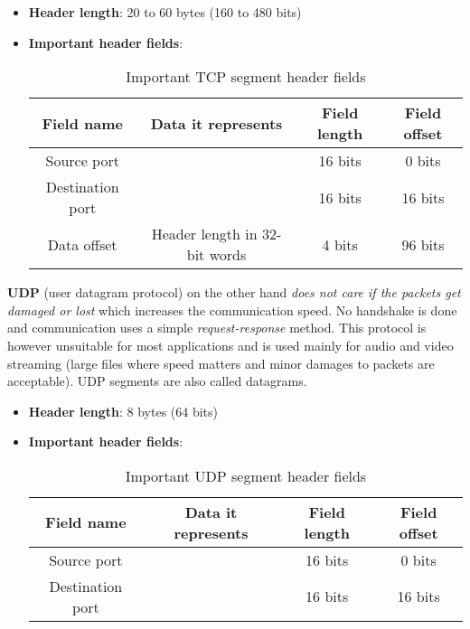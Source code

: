 \documentclass[a4paper]{article}
\begin{document}
  \begin{itemize}
    \item \textbf{Header length}: 20 to 60 bytes (160 to 480 bits)
    \item \textbf{Important header fields}:
      \begin{table}[h]
        \centering
        \begin{tabular}{|c|c|c|c|}
          \hline
          Field name & Data it represents & Field length & Field offset \\
          \hline
          \hline
          Source port & & 16 bits & 0 bits \\
          \hline
          Destination port & & 16 bits & 16 bits \\
          \hline
          Data offset & Header length in 32-bit words & 4 bits & 96 bits \\
          \hline
        \end{tabular}
        \caption{Important TCP segment header fields}
      \end{table}
  \end{itemize}

  \vspace{1cm}


  \textbf{UDP} (user datagram protocol) on the other hand 
  \textit{does not care if the packets get damaged or lost} which increases
  the communication speed. No handshake is done and communication uses a simple
  \textit{request-response} method. This protocol is however unsuitable for most 
  applications and is used mainly for audio and video streaming (large files
  where speed matters and minor damages to packets are acceptable).
  UDP segments are also called datagrams.

  \begin{itemize}
    \item \textbf{Header length}: 8 bytes (64 bits)
    \item \textbf{Important header fields}:
      \begin{table}[h]
        \centering
        \begin{tabular}{|c|c|c|c|}
          \hline
          Field name & Data it represents & Field length & Field offset \\
          \hline
          \hline
          Source port & & 16 bits & 0 bits \\
          \hline
          Destination port & & 16 bits & 16 bits \\
          \hline
        \end{tabular}
        \caption{Important UDP segment header fields}
      \end{table}
  \end{itemize}
\end{document}
